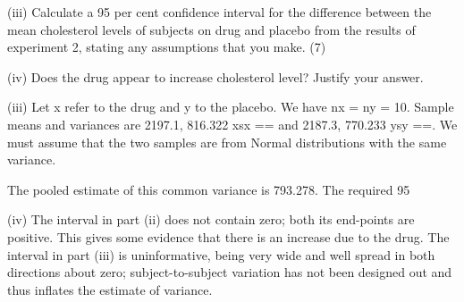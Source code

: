 \documentclass[a4paper,12pt]{article}
\begin{document}
\newpage
\begin{framed}
(iii) Calculate a 95 per cent confidence interval for the difference between the mean cholesterol levels of subjects on drug and placebo from the results of experiment 2, stating any assumptions that you make. (7) 
 
(iv) Does the drug appear to increase cholesterol level?  Justify your answer. 

\end{framed} 
(iii) Let x refer to the drug and y to the placebo.  We have nx = ny = 10.  Sample means and variances are 2197.1, 816.322 xsx == and 2187.3, 770.233 ysy ==.  We must assume that the two samples are from Normal distributions with the same variance. 
 
The pooled estimate of this common variance is 793.278.  The required 95%
 
 
(iv) The interval in part (ii) does not contain zero;  both its end-points are positive.  This gives some evidence that there is an increase due to the drug.  The interval in part (iii) is uninformative, being very wide and well spread in both directions about zero;  subject-to-subject variation has not been designed out and thus inflates the estimate of variance. 
 
\end{document}
